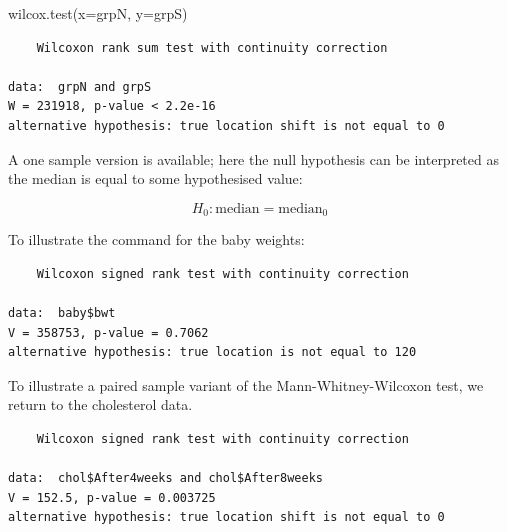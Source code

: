 \documentclass[
  oneside]{krantz}
\newenvironment{Shaded}{\begin{snugshade}}{\end{snugshade}}
\newcommand{\AttributeTok}[1]{\textcolor[rgb]{0.77,0.63,0.00}{#1}}
\newcommand{\CommentTok}[1]{\textcolor[rgb]{0.56,0.35,0.01}{\textit{#1}}}
\newcommand{\ConstantTok}[1]{\textcolor[rgb]{0.00,0.00,0.00}{#1}}
\newcommand{\DecValTok}[1]{\textcolor[rgb]{0.00,0.00,0.81}{#1}}
\newcommand{\FunctionTok}[1]{\textcolor[rgb]{0.00,0.00,0.00}{#1}}
\newcommand{\NormalTok}[1]{#1}
\newcommand{\SpecialCharTok}[1]{\textcolor[rgb]{0.00,0.00,0.00}{#1}}
\begin{document}
\begin{Shaded}
\begin{Highlighting}[]
\FunctionTok{wilcox.test}\NormalTok{(}\AttributeTok{x=}\NormalTok{grpN, }\AttributeTok{y=}\NormalTok{grpS)}
\end{Highlighting}
\end{Shaded}

\begin{verbatim}
    Wilcoxon rank sum test with continuity correction

data:  grpN and grpS
W = 231918, p-value < 2.2e-16
alternative hypothesis: true location shift is not equal to 0
\end{verbatim}

A one sample version is available; here the null hypothesis can be interpreted as the median is equal to some hypothesised value:

\[H_0: \textrm{median} = \textrm{median}_0\]

To illustrate the command for the baby weights:

\begin{Shaded}
\end{Shaded}

\begin{verbatim}
    Wilcoxon signed rank test with continuity correction

data:  baby$bwt
V = 358753, p-value = 0.7062
alternative hypothesis: true location is not equal to 120
\end{verbatim}

To illustrate a paired sample variant of the Mann-Whitney-Wilcoxon test, we return to the cholesterol data.

\begin{Shaded}
\end{Shaded}

\begin{verbatim}
    Wilcoxon signed rank test with continuity correction

data:  chol$After4weeks and chol$After8weeks
V = 152.5, p-value = 0.003725
alternative hypothesis: true location shift is not equal to 0
\end{verbatim}
\end{document}
